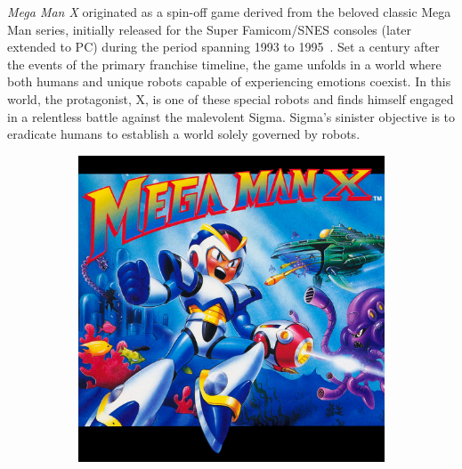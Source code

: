 \textit{Mega Man X} originated as a spin-off game derived from the beloved classic Mega Man series, initially released for the Super Famicom/SNES consoles (later extended to PC) during the period spanning 1993 to 1995~\cite{wiki:MMX}. Set a century after the events of the primary franchise timeline, the game unfolds in a world where both humans and unique robots capable of experiencing emotions coexist. In this world, the protagonist, X, is one of these special robots and finds himself engaged in a relentless battle against the malevolent Sigma. Sigma's sinister objective is to eradicate humans to establish a world solely governed by robots.

\begin{figure}[htp]
	\centering
	\begin{subfigure}{0.4\linewidth}
		\centering
		\includegraphics[width=\linewidth]{figures/X1/mmx_cover.jpeg}
	\end{subfigure}
	\begin{subfigure}{0.4\linewidth}
		\centering

\end{subfigure}
\end{figure}

